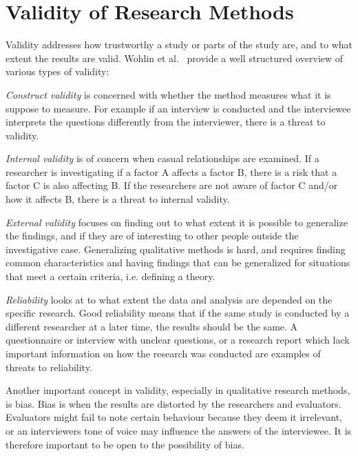 \section{Validity of Research Methods}
\label{subsec:threatsValidity}
Validity addresses how trustworthy a study or parts of the study are, and to what extent the results are valid. Wohlin et al.~\cite{experimentInSE} provide a well structured overview of various types of validity:

\textit{Construct validity} is concerned with whether the method measures what it is suppose to measure. For example if an interview is conducted and the interviewee interprets the questions differently from the interviewer, there is a threat to validity.

\textit{Internal validity} is of concern when casual relationships are examined. If a researcher is investigating if a factor A affects a factor B, there is a risk that a factor C is also affecting B. If the researchers are not aware of factor C and/or how it affects B, there is a threat to internal validity.

\textit{External validity} focuses on finding out to what extent it is possible to generalize the findings, and if they are of interesting to other people outside the investigative case. Generalizing qualitative methods is hard, and requires finding common characteristics and having findings that can be generalized for situations that meet a certain criteria, i.e. defining a theory.

\textit{Reliability} looks at to what extent the data and analysis are depended on the specific research. Good reliability means that if the same study is conducted by a different researcher at a later time, the results should be the same. A questionnaire or interview with unclear questions, or a research report which lack important information on how the research was conducted are examples of threats to reliability.


Another important concept in validity, especially in qualitative research methods, is bias. Bias is when the results are distorted by the researchers and evaluators. Evaluators might fail to note certain behaviour because they deem it irrelevant, or an interviewers tone of voice may influence the answers of the interviewee. It is therefore important to be open to the possibility of bias.

